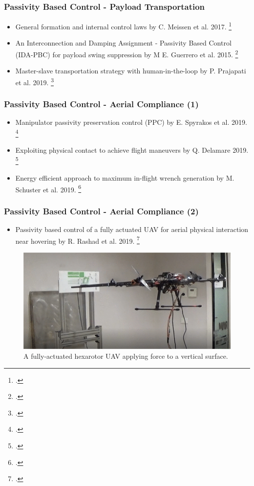\begin{frame}
	\frametitle{Passivity Based Control - Payload Transportation}
	\begin{itemize}
		\item General formation and internal control laws by C. Meissen et al. 2017. \footcite{passivity-based-formation-load}
		\item An Interconnection and Damping Assignment -
		Passivity Based Control (IDA-PBC) for payload swing suppression by M E. Guerrero et al. 2015. \footcite{passivity-based-payload-minimum-swing}
		\item Master-slave transportation strategy with human-in-the-loop by P. Prajapati et al. 2019. \footcite{payload-and-human}
	\end{itemize}
\end{frame}

\begin{frame}
	\frametitle{Passivity Based Control - Aerial Compliance (1)}
	
	\begin{itemize}
		\item Manipulator passivity preservation control (PPC) by E. Spyrakos et al. 2019. \footcite{passive-variable-impedance-compliant}
		\item Exploiting physical contact to achieve flight maneuvers by Q. Delamare 2019. \footcite{quadrotor-itneraction-environment}
		\item Energy efficient approach to maximum in-flight wrench generation by M. Schuster et al. 2019. \footcite{max-wrench-min-energy}
	\end{itemize}
\end{frame}

\begin{frame}
	\frametitle{Passivity Based Control - Aerial Compliance (2)}
	\begin{itemize}
		\item Passivity based control of a fully actuated UAV for aerial physical interaction near hovering by R. Rashad et al. 2019. \footcite{passivity-based-physical-interaction}  
	\end{itemize}
	\begin{figure}[H]
		\includegraphics[width=0.6\columnwidth]{figures/passivity-based-interaction.png}	
		\centering
		\caption{A fully-actuated hexarotor UAV applying force to a vertical surface.}
		\label{fig:aerial_compliance}
	\end{figure}
 \end{frame}